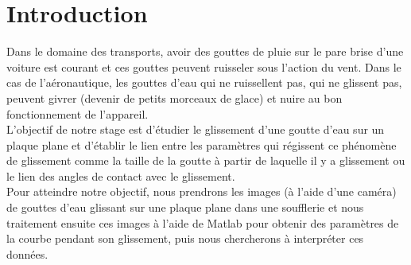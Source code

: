 \documentclass[french]{article}
\begin{document}
\section{Introduction}

Dans le domaine des transports, avoir des gouttes de pluie sur le pare brise d'une voiture est courant et ces gouttes peuvent ruisseler sous l'action du vent.
Dans le cas de l'aéronautique, les gouttes d'eau qui ne ruissellent pas, qui ne glissent pas, peuvent givrer (devenir de petits morceaux de glace) et nuire au bon fonctionnement de l'appareil.\\

L'objectif de notre stage est d'étudier le glissement d'une goutte d'eau sur un plaque plane et d'établir le lien entre les paramètres qui régissent ce phénomène de glissement comme la taille de la goutte à partir de laquelle il y a glissement ou le lien des angles de contact avec le glissement.\\

Pour atteindre notre objectif, nous prendrons les images (à l'aide d'une caméra) de gouttes d'eau glissant sur une plaque plane dans une soufflerie et nous traitement ensuite ces images à l'aide de Matlab pour obtenir des paramètres de la courbe pendant son glissement, puis nous chercherons à interpréter ces données.
\end{document}
